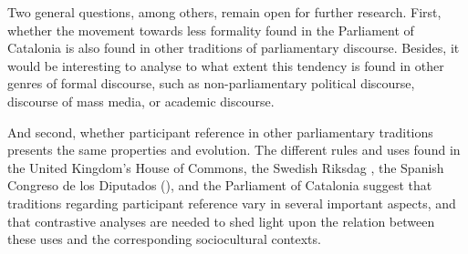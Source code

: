 \documentclass[output=paper]{langscibook}
\begin{document}
Two general questions, among others, remain open for further research. First, whether the movement towards less formality found in the Parliament of Catalonia is also found in other traditions of parliamentary discourse. Besides, it would be interesting to analyse to what extent this tendency is found in other genres of formal discourse, such as non-parliamentary political discourse, discourse of mass media, or academic discourse.

And second, whether participant reference in other parliamentary traditions presents the same properties and evolution. The different rules and uses found in the United Kingdom’s House of Commons, the Swedish Riksdag \citep{Ilie2010}, the Spanish Congreso de los Diputados (\citealt{DeCockNogué2017}), and the Parliament of Catalonia suggest that traditions regarding participant reference vary in several important aspects, and that contrastive analyses are needed to shed light upon the relation between these uses and the corresponding sociocultural contexts.
\end{document}
